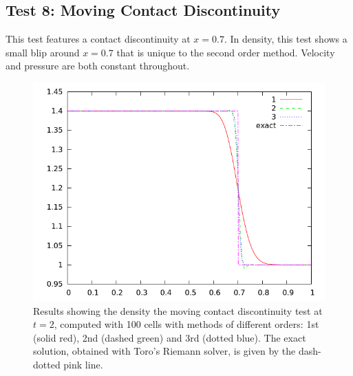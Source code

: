 \documentclass[10pt]{article}
\begin{document}
\subsection{Test 8: Moving Contact Discontinuity}
This test features a contact discontinuity at $x=0.7$. In density, this test shows a small blip around $x=0.7$ that is unique to the second order method. Velocity and pressure are both constant throughout. 
\begin{figure}[h]
  \begin{center}
     \includegraphics[width=.95\textwidth]{den_T8.png}	
  \end{center}
  \caption{Results showing the density the moving contact discontinuity test at $t=2$, computed with 100 cells with methods of different orders: 1st (solid red), 2nd (dashed green) and 3rd (dotted blue). The exact solution, obtained with Toro's Riemann solver, is given by the dash-dotted pink line.}
  \label{fig:den_T8}
\end{figure}
\end{document}
